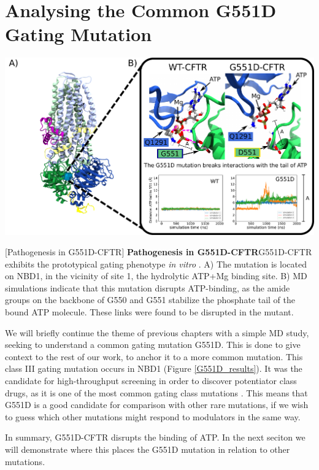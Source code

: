 \section{Analysing the Common G551D Gating Mutation}

	\begin{center}
		\includegraphics[width=\textwidth]{figures/perspective/G551D.pdf}
	\end{center}
\begingroup
\captionsetup{singlelinecheck = false, justification=raggedright}
[Pathogenesis in G551D-CFTR] {\textbf{Pathogenesis in G551D-CFTR}}{G551D-CFTR exhibits the prototypical gating phenotype \textit{in vitro} \cite{bompadre2007, wang2020}. A) The mutation is located on NBD1, in the vicinity of site 1, the hydrolytic ATP+Mg binding site. B) MD simulations indicate that this mutation disrupts ATP-binding, as the amide groups on the backbone of G550 and G551 stabilize the phosphate tail of the bound ATP molecule. These links were found to be disrupted in the mutant.} 
\label{G551D_results}
\endgroup

We will briefly continue the theme of previous chapters with a simple MD study, seeking to understand a common gating mutation G551D. This is done to give context to the rest of our work, to anchor it to a more common mutation. This class III gating mutation occurs in NBD1 (Figure \ref{G551D_results}). It was the candidate for high-throughput screening in order to discover potentiator class drugs, as it is one of the most common gating class mutations \cite{vangoor2009,li1996}. This means that G551D is a good candidate for comparison  with other rare mutations, if we wish to guess which other mutations might respond to modulators in the same way.

In summary, G551D-CFTR disrupts the binding of ATP. In the next seciton we will demonstrate where this places the G551D mutation in relation to other mutations. 

